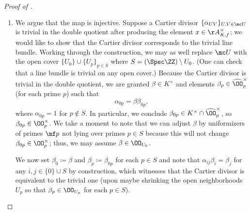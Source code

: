 \documentclass[../notes.tex]{subfiles}
\begin{document}
\begin{proof}[Proof of ]
\begin{enumerate}
		We are now ready to construct our Cartier divisor. The index set for our open cover will be $I\coloneqq\{0\}\cup S$, where $U_0=(\Spec\ZZ)\setminus S$, and $U_p$ is an open neighborhood of $p$ chosen small enough so that $x_p\in\OO_{U_0}^\times$. Now, we define $x_0\coloneqq1$ and define
		\[\alpha_{ij}\coloneqq x_jx_i^{-1}\]
		for any $i,j\in S$. Then the tuple $\{\alpha_{ij}\}_{i,j\in I}$ satisfies the cocycle condition and maps to $x$ by construction, so we are done.

		\item We argue that the map is injective. Suppose a Cartier divisor $\{\alpha_{UV}\}_{U,V\in\mc U}$ is trivial in the double quotient after producing the element $x\in\AA_{K,f}^\times$; we would like to show that the Cartier divisor corresponds to the trivial line bundle. Working through the construction, we may as well replace $\mc U$ with the open cover $\{U_0\}\cup\{U_p\}_{p\in S}$ where $S=(\Spec\ZZ)\setminus U_0$. (One can check that a line bundle is trivial on any open cover.) Because the Cartier divisor is trivial in the double quotient, we are granted $\beta\in K^\times$ and elements $\beta_p\in\widehat\OO_p^\times$ (for each prime $p$) such that
		\[\alpha_{0p}=\beta\beta_{0p},\]
		where $\alpha_{0p}=1$ for $p\notin S$. In particular, we conclude $\beta_{0p}\in K^\times\cap\widehat\OO_{p}^\times$, so $\beta_{0p}\in \OO_p^\times$. We take a moment to note that we can adjust $\beta$ by uniformizers of primes $\mf p$ not lying over primes $p\in S$ because this will not change $\beta_{0p}\in\OO_p^\times$; thus, we may assume $\beta\in\OO_{U_0}$.
		
		We now set $\beta_0\coloneqq\beta$ and $\beta_p\coloneqq\beta_{0p}$ for each $p\in S$ and note that $\alpha_{ij}\beta_i=\beta_j$ for any $i,j\in\{0\}\cup S$ by construction, which witnesses that the Cartier divisor is equivalent to the trivial one (upon maybe shrinking the open neighborhoods $U_p$ so that $\beta_p\in\OO_{U_p}$ for each $p\in S$).
		\qedhere
	\end{enumerate}
\end{proof}
\end{document}

